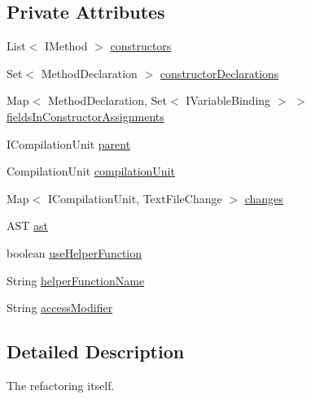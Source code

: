 \subsection*{Private Attributes}
\begin{DoxyCompactItemize}
\item 
List$<$ IMethod $>$ \hyperlink{classedu_1_1illinois_1_1canistelCassabanana_1_1RemoveDuplicateCodeInConstructorsRefactoring_a9d31c4c2b04e3ed5a8450714a08f1381}{constructors}
\item 
Set$<$ MethodDeclaration $>$ \hyperlink{classedu_1_1illinois_1_1canistelCassabanana_1_1RemoveDuplicateCodeInConstructorsRefactoring_a39607f363fde072a17c90ed499dd113b}{constructorDeclarations}
\item 
Map$<$ MethodDeclaration, Set$<$ IVariableBinding $>$ $>$ \hyperlink{classedu_1_1illinois_1_1canistelCassabanana_1_1RemoveDuplicateCodeInConstructorsRefactoring_af04c901de5714458dd9511acf45bd472}{fieldsInConstructorAssignments}
\item 
ICompilationUnit \hyperlink{classedu_1_1illinois_1_1canistelCassabanana_1_1RemoveDuplicateCodeInConstructorsRefactoring_acbe93b494e0487fdf5e6cc379b2fd0dc}{parent}
\item 
CompilationUnit \hyperlink{classedu_1_1illinois_1_1canistelCassabanana_1_1RemoveDuplicateCodeInConstructorsRefactoring_aa307d91c3347e0f99dca03fb3789e487}{compilationUnit}
\item 
Map$<$ ICompilationUnit, TextFileChange $>$ \hyperlink{classedu_1_1illinois_1_1canistelCassabanana_1_1RemoveDuplicateCodeInConstructorsRefactoring_af20942a1670a5ccd3debb4b0b10d629c}{changes}
\item 
AST \hyperlink{classedu_1_1illinois_1_1canistelCassabanana_1_1RemoveDuplicateCodeInConstructorsRefactoring_ab3b3926a515821596ed383f908c322c1}{ast}
\item 
boolean \hyperlink{classedu_1_1illinois_1_1canistelCassabanana_1_1RemoveDuplicateCodeInConstructorsRefactoring_ac3d10235e0a51b7d76e5a34233a842ae}{useHelperFunction}
\item 
String \hyperlink{classedu_1_1illinois_1_1canistelCassabanana_1_1RemoveDuplicateCodeInConstructorsRefactoring_aeec592ffa5b5903205515925d84c2bb8}{helperFunctionName}
\item 
String \hyperlink{classedu_1_1illinois_1_1canistelCassabanana_1_1RemoveDuplicateCodeInConstructorsRefactoring_ac98e605acbaebe4c90d19de7baae3798}{accessModifier}
\end{DoxyCompactItemize}


\subsection{Detailed Description}
The refactoring itself.

